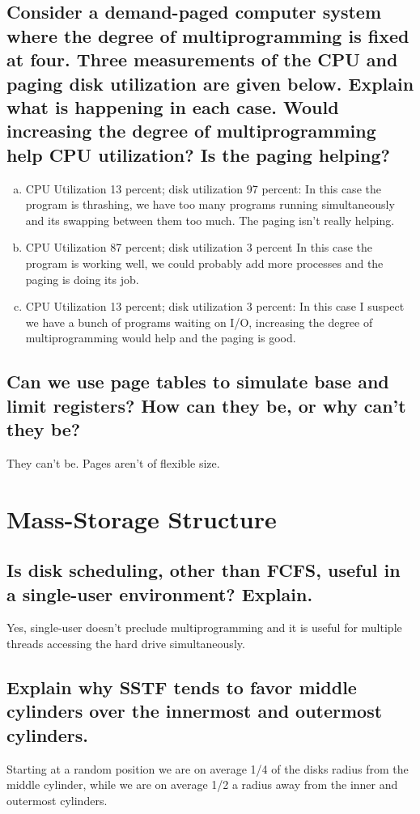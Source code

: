 \documentclass{book}%
\begin{document}
\section{Consider a demand-paged computer system where the degree of
multiprogramming is fixed at four. Three measurements of the CPU and paging disk
utilization are given below. Explain what is happening in each case. Would
increasing the degree of multiprogramming help CPU utilization? Is the paging
helping?}
\begin{enumerate}[a.]
\item CPU Utilization 13 percent; disk utilization 97 percent: In this case the
program is thrashing, we have too many programs running simultaneously and its
swapping between them too much. The paging isn't really helping.
\item CPU Utilization 87 percent; disk utilization 3 percent In this case the
program is working well, we could probably add more processes and the paging is
doing its job.
\item CPU Utilization 13 percent; disk utilization 3 percent: In this case I
suspect we have a bunch of programs waiting on I/O, increasing the degree of
multiprogramming would help and the paging is good.
\end{enumerate}
\section{Can we use page tables to simulate base and limit registers? How can
they be, or why can't they be?}
They can't be. Pages aren't of flexible size.
\chapter{Mass-Storage Structure}
\section{Is disk scheduling, other than FCFS, useful in a single-user
environment? Explain.}
Yes, single-user doesn't preclude multiprogramming and it is useful for multiple
threads accessing the hard drive simultaneously.
\section{Explain why SSTF tends to favor middle cylinders over the innermost and
outermost cylinders.}
Starting at a random position we are on average 1/4 of the disks radius from the
middle cylinder, while we are on average 1/2 a radius away from the inner and
outermost cylinders.
\end{document}
